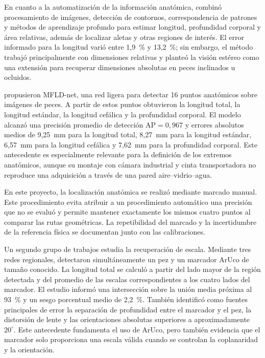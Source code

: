\documentclass{report}
\begin{document}
En cuanto a la automatización de la información anatómica, \textcite{Petrellis2021} combinó procesamiento de imágenes, detección de contornos, correspondencia de patrones y métodos de aprendizaje profundo para estimar longitud, profundidad corporal y área relativas, además de localizar aletas y otras regiones de interés. El error informado para la longitud varió entre 1,9~\% y 13,2~\%; sin embargo, el método trabajó principalmente con dimensiones relativas y planteó la visión estéreo como una extensión para recuperar dimensiones absolutas en peces inclinados u ocluidos.

\textcite{Saleh2023} propusieron MFLD-net, una red ligera para detectar 16 puntos anatómicos sobre imágenes de peces. A partir de estos puntos obtuvieron la longitud total, la longitud estándar, la longitud cefálica y la profundidad corporal. El modelo alcanzó una precisión promedio de detección $\mathrm{AP} = 0{,}967$ y errores absolutos medios de 9,25~mm para la longitud total, 8,27~mm para la longitud estándar, 6,57~mm para la longitud cefálica y 7,62~mm para la profundidad corporal. Este antecedente es especialmente relevante para la definición de los extremos anatómicos, aunque su montaje con cámara industrial y cinta transportadora no reproduce una adquisición a través de una pared aire--vidrio--agua.

En este proyecto, la localización anatómica se realizó mediante marcado manual. Este procedimiento evita atribuir a un procedimiento automático una precisión que no se evaluó y permite mantener exactamente los mismos cuatro puntos al comparar las rutas geométricas. La repetibilidad del marcado y la incertidumbre de la referencia física se documentan junto con las calibraciones.

Un segundo grupo de trabajos estudia la recuperación de escala. Mediante tres redes regionales, \textcite{Monkman2019} detectaron simultáneamente un pez y un marcador ArUco de tamaño conocido. La longitud total se calculó a partir del lado mayor de la región detectada y del promedio de las escalas correspondientes a los cuatro lados del marcador. El estudio informó una intersección sobre la unión media próxima al 93~\% y un sesgo porcentual medio de 2,2~\%. También identificó como fuentes principales de error la separación de profundidad entre el marcador y el pez, la distorsión de lente y las orientaciones absolutas superiores a aproximadamente $20^{\circ}$. Este antecedente fundamenta el uso de ArUco, pero también evidencia que el marcador solo proporciona una escala válida cuando se controlan la coplanaridad y la orientación.
\end{document}
